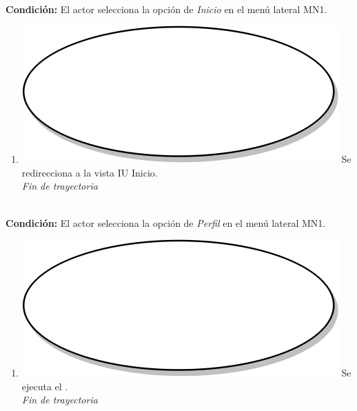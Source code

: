 \textbf{} \\
\textbf{Condición:} El actor selecciona la opción de \textit{Inicio} en el menú lateral MN1. \\
 \begin{enumerate}[label=G\arabic*]
    \item {\includegraphics[scale=.05]{Capitulo3/img/proceso.png} Se redirecciona a la vista IU Inicio.} \\
    \textit{Fin de trayectoria} \\
\end{enumerate}

\textbf{} \\
\textbf{Condición:} El actor selecciona la opción de \textit{Perfil} en el menú lateral MN1. \\
 \begin{enumerate}[label=H\arabic*]
    \item {\includegraphics[scale=.05]{Capitulo3/img/proceso.png} Se ejecuta el \textbf{}.} \\
    \textit{Fin de trayectoria} \\
\end{enumerate}

